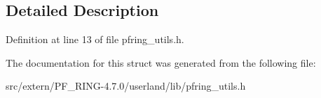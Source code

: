\subsection{Detailed Description}


Definition at line 13 of file pfring\_\-utils.h.



The documentation for this struct was generated from the following file:\begin{DoxyCompactItemize}
\item 
src/extern/PF\_\-RING-\/4.7.0/userland/lib/pfring\_\-utils.h\end{DoxyCompactItemize}
